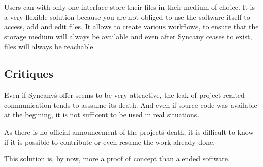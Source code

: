 Users can with only one interface store their files in their medium of choice. It is a very flexible solution because you are not obliged to use the software itself to access, add and edit files. It allows to create various workflows, to ensure that the storage medium will always be available and even after Syncany ceases to exist, files will always be reachable.

\subsection{Critiques}
Even if Syncany\'s offer seems to be very attractive, the leak of project-realted communication tends to asssume its death. And even if source code was available at the begining, it is not sufficent to be used in real situations.

As there is no official announcement of the project\'s death, it is difficult to know if it is possible to contribute or even resume the work already done.

This solution is, by now, more a proof of concept than a ended software.
